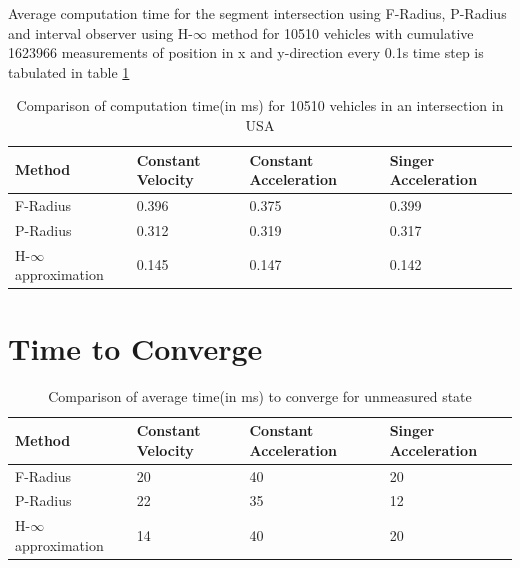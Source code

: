 Average computation time for the segment intersection using F-Radius, P-Radius and interval observer using H-$\infty$ method for 10510 vehicles with cumulative 1623966 measurements of position in x and y-direction every 0.1s time step is tabulated in table \ref{tab:comptime}

\begin{table}[htbp]
\caption{Comparison of computation time(in ms) for 10510 vehicles in an intersection in USA\\}
	\centering
	\renewcommand{\arraystretch}{1.1}
	\small	
	\begin{tabular}{l l l l}
		\toprule 
		\textbf{Method} & \textbf{Constant Velocity} & \textbf{Constant Acceleration} & \textbf{Singer Acceleration} \\ \midrule
		F-Radius & 0.396 & 0.375 & 0.399\\
		P-Radius & 0.312 & 0.319 & 0.317\\
		H-$\infty$ approximation & 0.145 & 0.147 & 0.142\\
		\bottomrule
	\end{tabular}
	\label{tab:comptime}
\end{table}

\section{Time to Converge}
\begin{table}[htbp]
\caption{Comparison of average time(in ms) to converge for unmeasured state\\}
	\centering
	\renewcommand{\arraystretch}{1.1}
	\small	
	\begin{tabular}{l l l l}
		\toprule 
		\textbf{Method} & \textbf{Constant Velocity} & \textbf{Constant Acceleration} & \textbf{Singer Acceleration} \\ \midrule
		F-Radius & 20 & 40 & 20\\
		P-Radius & 22 & 35 & 12\\
		H-$\infty$ approximation & 14 & 40 & 20\\
		\bottomrule
	\end{tabular}
	\label{tab:convtime}
\end{table}

